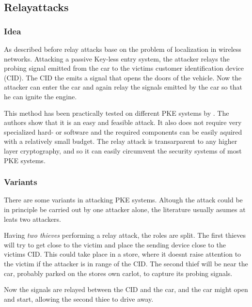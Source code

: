 
\subsection{Relayattacks}
\label{sec:relayAttacks}
\subsubsection*{Idea}
	As described before relay attacks base on the problem of localization in
	wireless networks.
	Attacking a passive Key-less entry system,
	the attacker relays the probing signal emitted from the car to the victims
	customer identification device (CID).
	The CID the emits a signal that opens the doors of the vehicle.
	Now the attacker can enter the car and again relay the signals emitted by the
	car so that he can ignite the engine.
	
	This method has been practically tested on different PKE systems by \cite{relayAttacksFranc}. %
	The authors show that it is an easy and feasible attack.
	It also does not require very specialized hard- or software and
	the required components can be easily aquired with a relatively small budget.
	The relay attack is transarparent to any higher layer cryptography,	%
	and so it can easily circumvent the security systems of most PKE systems.

\subsubsection*{Variants}
	There are some variants in attacking PKE systems.
	Altough the attack could be in principle be carried out by one attacker alone,
	the literature usually asumes at leats two attackers.

	\label{par:twoThieves}
	Having \textsl{two thieves} performing a relay attack,
	the roles are split.
	The first thieves will try to get close to the victim and place
	the sending device close to the victims CID.
	This could take place in a store,
	where it doesnt raise attention to the victim if the attacker
	is in range of the CID.
	The second thief will be near the car,
	probably parked on the stores own carlot,
	to capture its probing signals.

	Now the signals are relayed between the CID and the car,
	and the car might open and start,
	allowing the second thiee to drive away.

